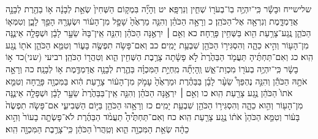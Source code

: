 \documentclass[twoside, openany, parskip=half, 11pt]{book}
\begin{document}
שלישייח וּבָשָׂ֕ר כִּֽי־יִהְיֶ֥ה בֽוֹ־בְעֹר֖וֹ שְׁחִ֑ין וְנִרְפָּֽא׃ יט וְהָיָ֞ה בִּמְק֤וֹם הַשְּׁחִין֙ שְׂאֵ֣ת לְבָנָ֔ה א֥וֹ בַהֶ֖רֶת לְבָנָ֣ה אֲדַמְדָּ֑מֶת וְנִרְאָ֖ה אֶל־הַכֹּהֵֽן׃ כ וְרָאָ֣ה הַכֹּהֵ֗ן וְהִנֵּ֤ה מַרְאֶ֙הָ֙ שָׁפָ֣ל מִן־הָע֔וֹר וּשְׂעָרָ֖הּ הָפַ֣ךְ לָבָ֑ן וְטִמְּא֧וֹ הַכֹּהֵ֛ן נֶֽגַע־צָרַ֥עַת הִ֖וא בַּשְּׁחִ֥ין פָּרָֽחָה׃ כא וְאִ֣ם ׀ יִרְאֶ֣נָּה הַכֹּהֵ֗ן וְהִנֵּ֤ה אֵֽין־בָּהּ֙ שֵׂעָ֣ר לָבָ֔ן וּשְׁפָלָ֥ה אֵינֶ֛נָּה מִן־הָע֖וֹר וְהִ֣יא כֵהָ֑ה וְהִסְגִּיר֥וֹ הַכֹּהֵ֖ן שִׁבְעַ֥ת יָמִֽים׃ כב וְאִם־פָּשֹׂ֥ה תִפְשֶׂ֖ה בָּע֑וֹר וְטִמֵּ֧א הַכֹּהֵ֛ן אֹת֖וֹ נֶ֥גַע הִֽוא׃ כג וְאִם־תַּחְתֶּ֜יהָ תַּעֲמֹ֤ד הַבַּהֶ֙רֶת֙ לֹ֣א פָשָׂ֔תָה צָרֶ֥בֶת הַשְּׁחִ֖ין הִ֑וא וְטִהֲר֖וֹ הַכֹּהֵֽן׃
רביעי (שני)כד א֣וֹ בָשָׂ֔ר כִּֽי־יִהְיֶ֥ה בְעֹר֖וֹ מִכְוַת־אֵ֑שׁ וְֽהָיְתָ֞ה מִֽחְיַ֣ת הַמִּכְוָ֗ה בַּהֶ֛רֶת לְבָנָ֥ה אֲדַמְדֶּ֖מֶת א֥וֹ לְבָנָֽה׃ כה וְרָאָ֣ה אֹתָ֣הּ הַכֹּהֵ֡ן וְהִנֵּ֣ה נֶהְפַּךְ֩ שֵׂעָ֨ר לָבָ֜ן בַּבַּהֶ֗רֶת וּמַרְאֶ֙הָ֙ עָמֹ֣ק מִן־הָע֔וֹר צָרַ֣עַת הִ֔וא בַּמִּכְוָ֖ה פָּרָ֑חָה וְטִמֵּ֤א אֹתוֹ֙ הַכֹּהֵ֔ן נֶ֥גַע צָרַ֖עַת הִֽוא׃ כו וְאִ֣ם ׀ יִרְאֶ֣נָּה הַכֹּהֵ֗ן וְהִנֵּ֤ה אֵֽין־בַּבַּהֶ֙רֶת֙ שֵׂעָ֣ר לָבָ֔ן וּשְׁפָלָ֥ה אֵינֶ֛נָּה מִן־הָע֖וֹר וְהִ֣וא כֵהָ֑ה וְהִסְגִּיר֥וֹ הַכֹּהֵ֖ן שִׁבְעַ֥ת יָמִֽים׃ כז וְרָאָ֥הוּ הַכֹּהֵ֖ן בַּיּ֣וֹם הַשְּׁבִיעִ֑י אִם־פָּשֹׂ֤ה תִפְשֶׂה֙ בָּע֔וֹר וְטִמֵּ֤א הַכֹּהֵן֙ אֹת֔וֹ נֶ֥גַע צָרַ֖עַת הִֽוא׃ כח וְאִם־תַּחְתֶּ֩יהָ֩ תַעֲמֹ֨ד הַבַּהֶ֜רֶת לֹא־פָשְׂתָ֤ה בָעוֹר֙ וְהִ֣וא כֵהָ֔ה שְׂאֵ֥ת הַמִּכְוָ֖ה הִ֑וא וְטִֽהֲרוֹ֙ הַכֹּהֵ֔ן כִּֽי־צָרֶ֥בֶת הַמִּכְוָ֖ה הִֽוא׃
\end{document}
